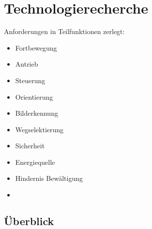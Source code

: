 \newpage
\section{Technologierecherche}

Anforderungen in Teilfunktionen zerlegt:
\begin{itemize}
    \item Fortbewegung
    \item Antrieb
    \item Steuerung
    \item Orientierung
    \item Bilderkennung
    \item Wegselektierung
    \item Sicherheit
    \item Energiequelle
    \item Hindernis Bewältigung
    \item 
\end{itemize}

\subsection*{Überblick}

